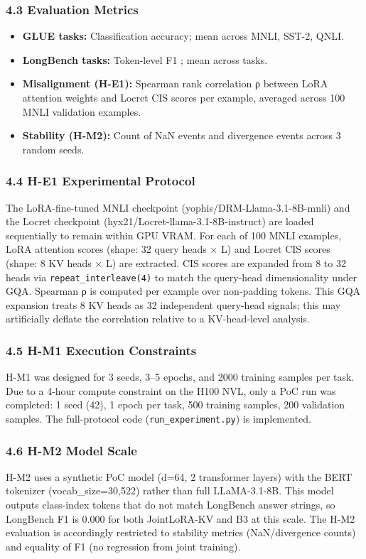 \subsubsection{4.3 Evaluation Metrics}

\begin{itemize}
\item \textbf{GLUE tasks:} Classification accuracy; mean across MNLI, SST-2, QNLI.
\item \textbf{LongBench tasks:} Token-level F1 \citep{Rajpurkaretal2016}; mean across tasks.
\item \textbf{Misalignment (H-E1):} Spearman rank correlation ρ between LoRA attention weights and Locret CIS scores per example, averaged across 100 MNLI validation examples.
\item \textbf{Stability (H-M2):} Count of NaN events and divergence events across 3 random seeds.
\end{itemize}

\subsubsection{4.4 H-E1 Experimental Protocol}

The LoRA-fine-tuned MNLI checkpoint (yophis/DRM-Llama-3.1-8B-mnli) and the Locret checkpoint (hyx21/Locret-llama-3.1-8B-instruct) are loaded sequentially to remain within GPU VRAM. For each of 100 MNLI examples, LoRA attention scores (shape: 32 query heads × L) and Locret CIS scores (shape: 8 KV heads × L) are extracted. CIS scores are expanded from 8 to 32 heads via \texttt{repeat_interleave(4)} to match the query-head dimensionality under GQA. Spearman ρ is computed per example over non-padding tokens. This GQA expansion treats 8 KV heads as 32 independent query-head signals; this may artificially deflate the correlation relative to a KV-head-level analysis.

\subsubsection{4.5 H-M1 Execution Constraints}

H-M1 was designed for 3 seeds, 3–5 epochs, and 2000 training samples per task. Due to a 4-hour compute constraint on the H100 NVL, only a PoC run was completed: 1 seed (42), 1 epoch per task, 500 training samples, 200 validation samples. The full-protocol code (\texttt{run_experiment.py}) is implemented.

\subsubsection{4.6 H-M2 Model Scale}

H-M2 uses a synthetic PoC model (d=64, 2 transformer layers) with the BERT tokenizer (vocab_size=30,522) rather than full LLaMA-3.1-8B. This model outputs class-index tokens that do not match LongBench answer strings, so LongBench F1 is 0.000 for both JointLoRA-KV and B3 at this scale. The H-M2 evaluation is accordingly restricted to stability metrics (NaN/divergence counts) and equality of F1 (no regression from joint training).

